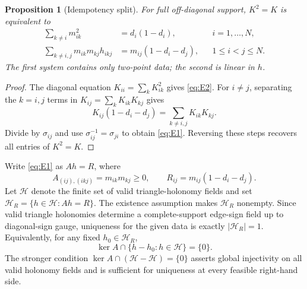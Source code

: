 \documentclass[11pt,a4paper]{article}
\newtheorem{proposition}[theorem]{Proposition}
\theoremstyle{definition}
\theoremstyle{remark}
\begin{document}
\begin{proposition}[Idempotency split]\label{prop:split}
For full off-diagonal support, $K^2=K$ is equivalent to
\begin{align}
 \sum_{k\ne i}m_{ik}^2&=d_i(1-d_i), && i=1,\ldots,N, \label{eq:E2}\\
 \sum_{k\ne i,j}m_{ik}m_{kj}h_{ikj}
 &=m_{ij}(1-d_i-d_j), && 1\le i<j\le N. \label{eq:E1}
\end{align}
The first system contains only two-point data; the second is linear in $h$.
\end{proposition}

\begin{proof}
The diagonal equation $K_{ii}=\sum_kK_{ik}^2$ gives \eqref{eq:E2}.  For $i\ne j$,
separating the $k=i,j$ terms in $K_{ij}=\sum_kK_{ik}K_{kj}$ gives
\[
 K_{ij}(1-d_i-d_j)=\sum_{k\ne i,j}K_{ik}K_{kj}.
\]
Divide by $\sigma_{ij}$ and use $\sigma_{ij}^{-1}=\sigma_{ji}$ to obtain
\eqref{eq:E1}.  Reversing these steps recovers all entries of $K^2=K$.
\end{proof}

Write \eqref{eq:E1} as $Ah=R$, where
\begin{equation}
 A_{(ij),(ikj)}=m_{ik}m_{kj}\ge0,
 \qquad R_{ij}=m_{ij}(1-d_i-d_j).
 \label{eq:linear}
\end{equation}
Let $\mathcal H$ denote the finite set of valid triangle-holonomy fields and set
$\mathcal H_R=\{h\in\mathcal H:Ah=R\}$.  The existence assumption makes
$\mathcal H_R$ nonempty.  Since valid triangle holonomies determine a complete-support
edge-sign field up to diagonal-sign gauge, uniqueness for the given data is exactly
$|\mathcal H_R|=1$.  Equivalently, for any fixed $h_0\in\mathcal H_R$,
\begin{equation}
 \ker A\cap\{h-h_0:h\in\mathcal H\}=\{0\}.
 \label{eq:lattice}
\end{equation}
The stronger condition $\ker A\cap(\mathcal H-\mathcal H)=\{0\}$ asserts global
injectivity on all valid holonomy fields and is sufficient for uniqueness at every
feasible right-hand side.
\end{document}
